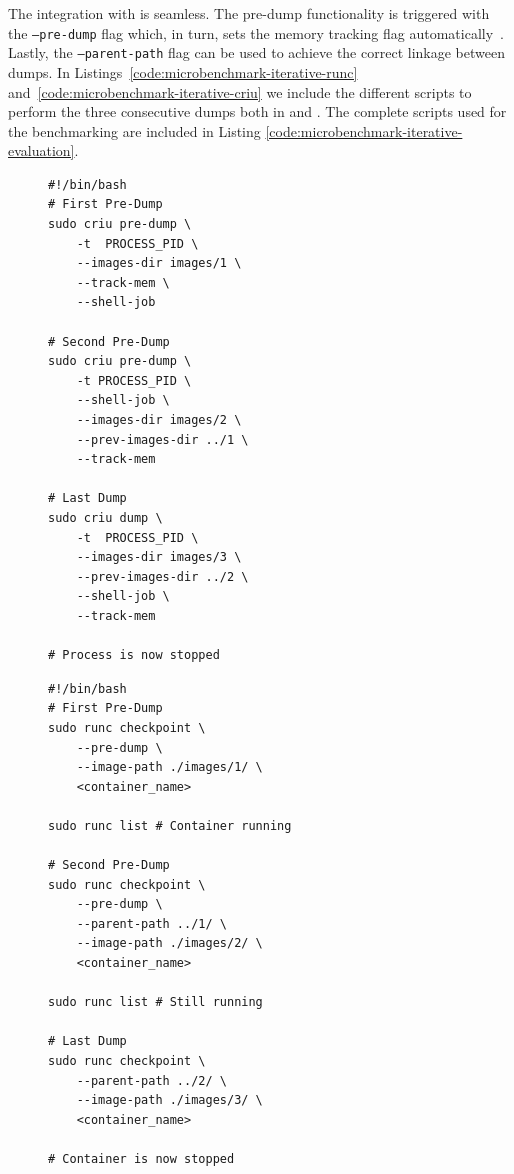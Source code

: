 The integration with \runc is seamless.
The pre-dump functionality is triggered with the \texttt{--pre-dump} flag which, in turn, sets the memory tracking flag automatically~\cite{runc-memtrack}.
Lastly, the \texttt{--parent-path} flag can be used to achieve the correct linkage between dumps.
In Listings~\ref{code:microbenchmark-iterative-runc} and~\ref{code:microbenchmark-iterative-criu} we include the different scripts to perform the three consecutive dumps both in \criu and \runc.
The complete scripts used for the benchmarking are included in Listing \ref{code:microbenchmark-iterative-evaluation}.
\begin{figure}[h!]
\begin{minipage}{.45\textwidth}
    \begin{lstlisting}[style=Bash,caption={Scripts to perform two pre-dumps and a dump of a running process using \criu.},label={code:microbenchmark-iterative-runc}]
#!/bin/bash
# First Pre-Dump
sudo criu pre-dump \
    -t  PROCESS_PID \
    --images-dir images/1 \
    --track-mem \
    --shell-job 

# Second Pre-Dump
sudo criu pre-dump \
    -t PROCESS_PID \
    --shell-job \
    --images-dir images/2 \
    --prev-images-dir ../1 \
    --track-mem

# Last Dump
sudo criu dump \
    -t  PROCESS_PID \
    --images-dir images/3 \
    --prev-images-dir ../2 \
    --shell-job \
    --track-mem

# Process is now stopped
\end{lstlisting}
\end{minipage}\hfill
\begin{minipage}{.45\textwidth}
    \begin{lstlisting}[style=Bash,caption={Scripts to perform two pre-dumps and a dump of a running container using \runc.},label={code:microbenchmark-iterative-criu}]
#!/bin/bash
# First Pre-Dump
sudo runc checkpoint \
    --pre-dump \
    --image-path ./images/1/ \
    <container_name>

sudo runc list # Container running

# Second Pre-Dump
sudo runc checkpoint \
    --pre-dump \
    --parent-path ../1/ \
    --image-path ./images/2/ \
    <container_name>

sudo runc list # Still running

# Last Dump
sudo runc checkpoint \
    --parent-path ../2/ \
    --image-path ./images/3/ \
    <container_name>

# Container is now stopped
\end{lstlisting}
\end{minipage}
\end{figure}

